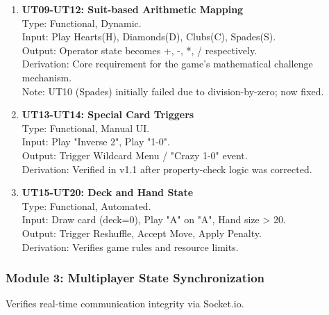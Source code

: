 \documentclass[12pt, titlepage]{article}
\begin{document}
\begin{enumerate}
    \item \textbf{UT09-UT12: Suit-based Arithmetic Mapping}\\
    Type: Functional, Dynamic. \\
    Input: Play Hearts(H), Diamonds(D), Clubs(C), Spades(S). \\
    Output: Operator state becomes +, -, *, / respectively. \\
    Derivation: Core requirement for the game's mathematical challenge mechanism. \\
    Note: UT10 (Spades) initially failed due to division-by-zero; now fixed.

    \item \textbf{UT13-UT14: Special Card Triggers}\\
    Type: Functional, Manual UI. \\
    Input: Play "Inverse 2", Play "1-0". \\
    Output: Trigger Wildcard Menu / "Crazy 1-0" event. \\
    Derivation: Verified in v1.1 after property-check logic was corrected.

    \item \textbf{UT15-UT20: Deck and Hand State}\\
    Type: Functional, Automated. \\
    Input: Draw card (deck=0), Play "A" on "A", Hand size > 20. \\
    Output: Trigger Reshuffle, Accept Move, Apply Penalty. \\
    Derivation: Verifies game rules and resource limits.
\end{enumerate}

\subsubsection{Module 3: Multiplayer State Synchronization}
Verifies real-time communication integrity via Socket.io.
\end{document}
